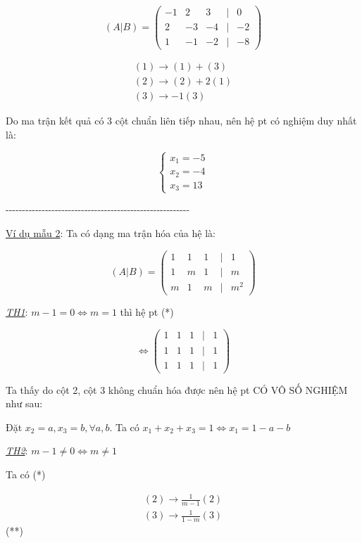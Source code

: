 \documentclass[12pt,a4paper]{article}
\let\ul\uline
\begin{document}
$$(A|B) = \begin{pmatrix} -1 & 2 & 3 & | & 0 \\ 2 & -3 & -4 & | & -2 \\ 1 & -1 & -2 & | & -8 \end{pmatrix}$$

$$\begin{matrix} (1) \rightarrow (1) + (3) \\ (2) \rightarrow (2) + 2(1) \\ (3) \rightarrow -1(3) \end{matrix}$$

Do ma trận kết quả có 3 cột chuẩn liên tiếp nhau, nên hệ pt có nghiệm
duy nhất là:

$$\begin{cases} x_1 = -5 \\ x_2 = -4 \\ x_3 = 13 \end{cases}$$

-\/-\/-\/-\/-\/-\/-\/-\/-\/-\/-\/-\/-\/-\/-\/-\/-\/-\/-\/-\/-\/-\/-\/-\/-\/-\/-\/-\/-\/-\/-\/-\/-\/-\/-\/-\/-\/-\/-\/-\/-\/-\/-\/-\/-\/-\/-\/-\/-\/-\/-\/-\/-\/-\/-\/-

\ul{Ví dụ mẫu 2}: Ta có dạng ma trận hóa của hệ là:

$$(A|B) = \begin{pmatrix} 1 & 1 & 1 & | & 1 \\ 1 & m & 1 & | & m \\ m & 1 & m & | & m^2 \end{pmatrix}$$

\emph{\ul{TH1}}: $m - 1 = 0 \Leftrightarrow m = 1$ thì hệ pt (*)

$$\Leftrightarrow \begin{pmatrix} 1 & 1 & 1 & | & 1 \\ 1 & 1 & 1 & | & 1 \\ 1 & 1 & 1 & | & 1 \end{pmatrix}$$

Ta thấy do cột 2, cột 3 không chuẩn hóa được nên hệ pt CÓ VÔ SỐ NGHIỆM
như sau:

Đặt $x_2 = a, x_3 = b, \forall a, b$. Ta có
$x_1 + x_2 + x_3 = 1 \Leftrightarrow x_1 = 1 - a - b$

\emph{\ul{TH2}}: $m - 1 \neq 0 \Leftrightarrow m \neq 1$

Ta có (*)

$$\begin{matrix} (2) \rightarrow \frac{1}{m-1}(2) \\ (3) \rightarrow \frac{1}{1-m}(3) \end{matrix}$$(**)
\end{document}
